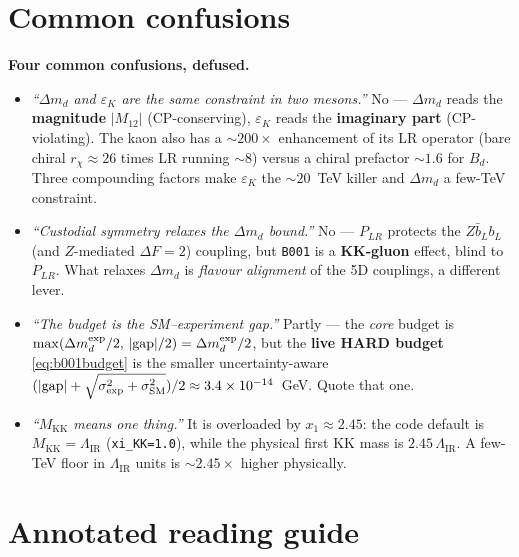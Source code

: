 \documentclass[11pt]{article}
\newenvironment{callout}[1]{%
  \par\medskip\begin{shaded}\noindent\textbf{#1}\par\smallskip}{\end{shaded}\medskip}
\newcommand{\MKK}{M_{\mathrm{KK}}}
\newcommand{\LIR}{\Lambda_{\mathrm{IR}}}
\newcommand{\Mtwelve}{M_{12}}
\newcommand{\dmd}{\Delta m_d}
\newcommand{\epsK}{\varepsilon_K}
\newcommand{\code}[1]{\texttt{#1}}
\theoremstyle{definition}
\begin{document}
\part*{Common confusions}

\begin{callout}{Four common confusions, defused.}
\begin{itemize}[leftmargin=1.2em,nosep]
\item[\textbf{A.}] \emph{``$\dmd$ and $\epsK$ are the same constraint in two
mesons.''} No --- $\dmd$ reads the \textbf{magnitude} $|\Mtwelve|$ (CP-conserving),
$\epsK$ reads the \textbf{imaginary part} (CP-violating). The kaon also has a
$\sim$$200\times$ enhancement of its LR operator (bare chiral $r_\chi\!\approx\!26$
times LR running $\sim$$8$) versus a chiral prefactor $\sim$$1.6$ for $B_d$. Three
compounding factors make $\epsK$ the $\sim$$20$~TeV killer and $\dmd$ a few-TeV
constraint.
\item[\textbf{B.}] \emph{``Custodial symmetry relaxes the $\dmd$ bound.''} No ---
$P_{LR}$ protects the $Z\bar b_L b_L$ (and $Z$-mediated $\Delta F=2$) coupling,
but \code{B001} is a \textbf{KK-gluon} effect, blind to $P_{LR}$. What relaxes
$\dmd$ is \emph{flavour alignment} of the 5D couplings, a different lever.
\item[\textbf{C.}] \emph{``The budget is the SM--experiment gap.''} Partly --- the
\emph{core} budget is $\max(\dmd^{\rm exp}/2,\,|{\rm gap}|/2)=\dmd^{\rm exp}/2$,
but the \textbf{live HARD budget} \eqref{eq:b001budget} is the smaller
uncertainty-aware $(|{\rm gap}|+\sqrt{\sigma_{\rm exp}^2+\sigma_{\rm SM}^2})/2
\approx3.4\times10^{-14}$~GeV. Quote that one.
\item[\textbf{D.}] \emph{``$\MKK$ means one thing.''} It is overloaded by
$x_1\approx2.45$: the code default is $\MKK=\LIR$ (\code{xi\_KK=1.0}), while the
physical first KK mass is $2.45\,\LIR$. A few-TeV floor in $\LIR$ units is
$\sim2.45\times$ higher physically.
\end{itemize}
\end{callout}

\part*{Annotated reading guide}
\end{document}
